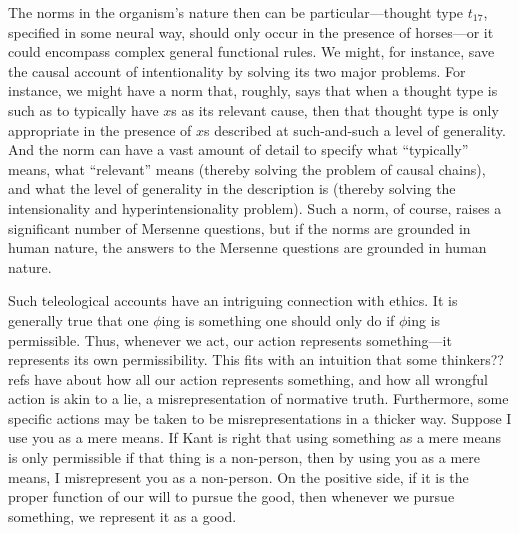 The norms in the organism's nature then can be particular---thought type $t_{17}$, specified in some neural way, should 
only occur in the presence of horses---or it could encompass complex general functional rules. We might, for instance, 
save the causal account of intentionality by solving its two major problems. For instance, we might have a norm that, roughly, 
says that when a thought type is such as to typically have $x$s as its relevant cause, then that thought type is only appropriate
in the presence of $x$s described at such-and-such a level of generality. And the norm can have a vast amount of detail to 
specify what ``typically'' means, what ``relevant'' means (thereby solving the problem of causal chains), and what the level 
of generality in the description is (thereby solving the intensionality and hyperintensionality problem). Such a norm, of course,
raises a significant number of Mersenne questions, but if the norms are grounded in human nature, the answers to the Mersenne 
questions are grounded in human nature.

Such teleological accounts have an intriguing connection with ethics. It is generally true that one $\phi$ing is something one should only do 
if $\phi$ing is permissible. Thus, whenever we act, our action represents something---it represents its own permissibility. 
This fits with an intuition that some thinkers??refs have about how all our action represents something, and how all wrongful
action is akin to a lie, a misrepresentation of normative truth. Furthermore, some specific actions may be taken to be 
misrepresentations in a thicker way. Suppose I use you as a mere means. If Kant is right that using something as a mere means 
is only permissible if that thing is a non-person, then by using you as a mere means, I misrepresent you as a non-person.  
On the positive side, if it is the proper function of our will to pursue the good, then whenever we pursue something, we 
represent it as a good. 

